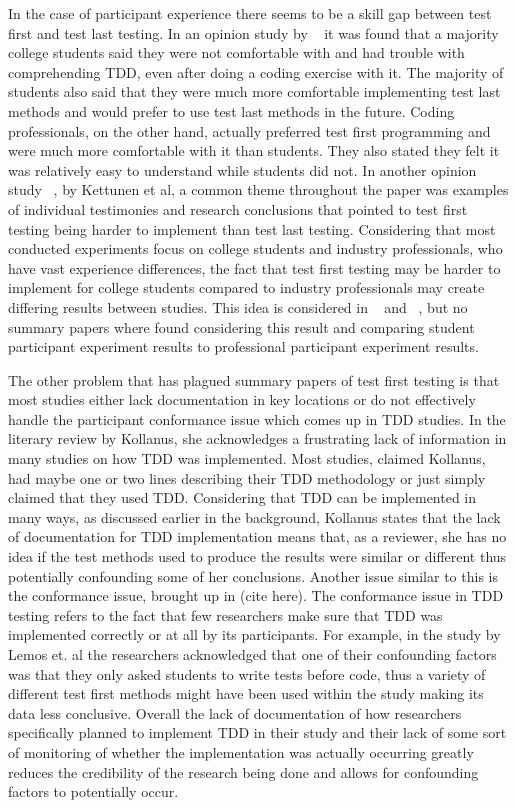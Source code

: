 \documentclass{sig-alternate}
\begin{document}
In the case of participant experience there seems to be a skill gap between test first and test last testing.  In an opinion study by ~\cite{Janzen:2007} it was found that a majority college students said they were not comfortable with and had trouble with comprehending TDD, even after doing a coding exercise with it.  The majority of students also said that they were much more comfortable implementing test last methods and would prefer to use test last methods in the future.  Coding professionals, on the other hand, actually preferred test first programming and were much more comfortable with it than students.  They also stated they felt it was relatively easy to understand while students did not. In another opinion study ~\cite{Kettunen:2010}, by Kettunen et al, a common theme throughout the paper was examples of individual testimonies and research conclusions that pointed to test first testing being harder to implement than test last testing.   Considering that most conducted experiments focus on college students and industry professionals, who have vast experience differences, the fact that test first testing may be harder to implement for college students compared to industry professionals may create differing results between studies.   This idea is considered in ~\cite{Hammond:2012} and ~\cite{Kettunen:2010}, but no summary papers where found considering this result and comparing student participant experiment results to professional participant experiment results.

The other problem that has plagued summary papers of test first testing is that most studies either lack documentation in key locations or do not effectively handle the participant conformance issue which comes up in TDD studies.  In the literary review by Kollanus, she acknowledges a frustrating lack of information in many studies on how TDD was implemented.  Most studies, claimed Kollanus, had maybe one or two lines describing their TDD methodology or just simply claimed that they used TDD.  Considering that TDD can be implemented in many ways, as discussed earlier in the background, Kollanus states that the lack of documentation for TDD implementation means that, as a reviewer, she has no idea if the test methods used to produce the results were similar or different thus potentially confounding some of her conclusions.  Another issue similar to this is the conformance issue, brought up in (cite here).  The conformance issue in TDD testing refers to the fact that few researchers make sure that TDD was implemented correctly or at all by its participants.  For example, in the study by Lemos et. al the researchers acknowledged that one of their confounding factors was that they only asked students to write tests before code, thus a variety of different test first methods might have been used within the study making its data less conclusive.   Overall the lack of documentation of how researchers specifically planned to implement TDD in their study and their lack of some sort of monitoring of whether the implementation was actually occurring greatly reduces the credibility of the research being done and allows for confounding factors to potentially occur. 
\end{document}
